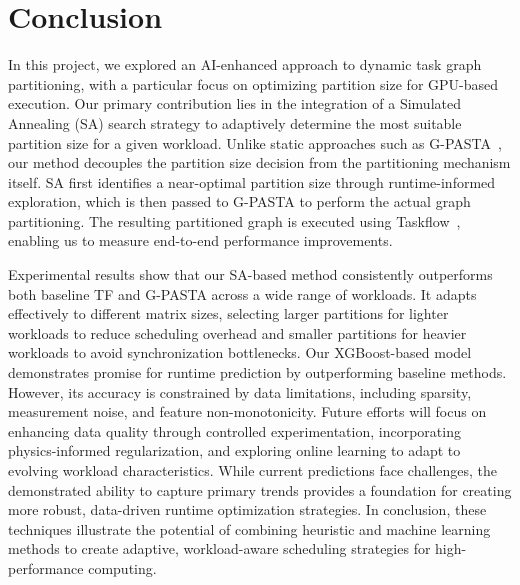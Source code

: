 \documentclass[9pt,conference]{IEEEtran}
\begin{document}
\section{Conclusion}
In this project, we explored an AI-enhanced approach to dynamic task graph partitioning, with a particular focus on optimizing partition size for GPU-based execution. 
Our primary contribution lies in the integration of a Simulated Annealing (SA) search strategy to adaptively determine the most suitable partition size for a given workload. 
Unlike static approaches such as G-PASTA~\cite{zhang2024g}, our method decouples the partition size decision from the partitioning mechanism itself. 
SA first identifies a near-optimal partition size through runtime-informed exploration, which is then passed to G-PASTA to perform the actual graph partitioning. 
The resulting partitioned graph is executed using Taskflow~\cite{huang2021taskflow}, enabling us to measure end-to-end performance improvements.

Experimental results show that our SA-based method consistently outperforms both baseline TF and G-PASTA across a wide range of workloads. 
It adapts effectively to different matrix sizes, selecting larger partitions for lighter workloads to reduce scheduling overhead and smaller partitions for heavier workloads to avoid synchronization bottlenecks.
Our XGBoost-based model demonstrates promise for runtime prediction by outperforming baseline methods. However, its accuracy is constrained by data limitations, including sparsity, measurement noise, and feature non-monotonicity. Future efforts will focus on enhancing data quality through controlled experimentation, incorporating physics-informed regularization, and exploring online learning to adapt to evolving workload characteristics. While current predictions face challenges, the demonstrated ability to capture primary trends provides a foundation for creating more robust, data-driven runtime optimization strategies.
In conclusion, these techniques illustrate the potential of combining heuristic and machine learning methods to create adaptive, workload-aware scheduling strategies for high-performance computing.




\end{document}
